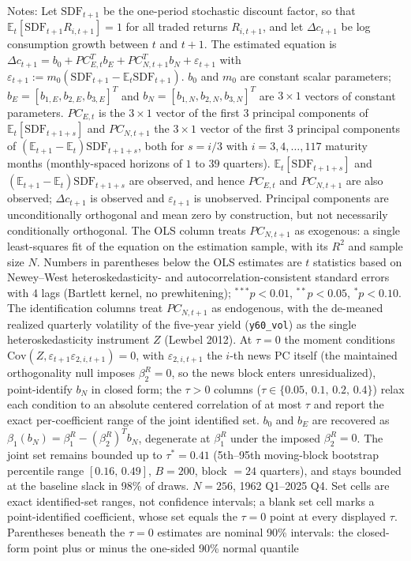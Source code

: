 \documentclass[11pt]{article}
\begin{document}
\begin{table}[!htbp]
\begin{threeparttable}
\begin{tablenotes}[flushleft]
\item Notes: Let $\mathrm{SDF}_{t+1}$ be the one-period stochastic discount factor, so that $\mathbb{E}_{t}[\mathrm{SDF}_{t+1}R_{i,t+1}]=1$ for all traded returns $R_{i,t+1}$, and let $\Delta c_{t+1}$ be log consumption growth between $t$ and $t+1$. The estimated equation is $\Delta c_{t+1}=b_{0}+PC_{E,t}^{T}b_{E}+PC_{N,t+1}^{T}b_{N}+\varepsilon_{t+1}$ with $\varepsilon_{t+1}:=m_{0}(\mathrm{SDF}_{t+1}-\mathbb{E}_{t}\mathrm{SDF}_{t+1})$. $b_{0}$ and $m_{0}$ are constant scalar parameters; $b_{E}=[b_{1,E},b_{2,E},b_{3,E}]^{T}$ and $b_{N}=[b_{1,N},b_{2,N},b_{3,N}]^{T}$ are $3\times1$ vectors of constant parameters. $PC_{E,t}$ is the $3\times1$ vector of the first 3 principal components of $\mathbb{E}_{t}[\mathrm{SDF}_{t+1+s}]$ and $PC_{N,t+1}$ the $3\times1$ vector of the first 3 principal components of $(\mathbb{E}_{t+1}-\mathbb{E}_{t})\mathrm{SDF}_{t+1+s}$, both for $s=i/3$ with $i=3,4,\ldots,117$ maturity months (monthly-spaced horizons of $1$ to $39$ quarters). $\mathbb{E}_{t}[\mathrm{SDF}_{t+1+s}]$ and $(\mathbb{E}_{t+1}-\mathbb{E}_{t})\mathrm{SDF}_{t+1+s}$ are observed, and hence $PC_{E,t}$ and $PC_{N,t+1}$ are also observed; $\Delta c_{t+1}$ is observed and $\varepsilon_{t+1}$ is unobserved. Principal components are unconditionally orthogonal and mean zero by construction, but not necessarily conditionally orthogonal. The OLS column treats $PC_{N,t+1}$ as exogenous: a single least-squares fit of the equation on the estimation sample, with its $R^2$ and sample size $N$. Numbers in parentheses below the OLS estimates are $t$ statistics based on Newey--West heteroskedasticity- and autocorrelation-consistent standard errors with 4 lags (Bartlett kernel, no prewhitening); $^{***}p<0.01$, $^{**}p<0.05$, $^{*}p<0.10$. The identification columns treat $PC_{N,t+1}$ as endogenous, with the de-meaned realized quarterly volatility of the five-year yield (\texttt{y60\_vol}) as the single heteroskedasticity instrument $Z$ (Lewbel 2012). At $\tau{=}0$ the moment conditions $\mathrm{Cov}(Z,\varepsilon_{t+1}\varepsilon_{2,i,t+1})=0$, with $\varepsilon_{2,i,t+1}$ the $i$-th news PC itself (the maintained orthogonality null imposes $\beta_{2}^{R}=0$, so the news block enters unresidualized), point-identify $b_{N}$ in closed form; the $\tau{>}0$ columns ($\tau\in\{0.05,\,0.1,\,0.2,\,0.4\}$) relax each condition to an absolute centered correlation of at most $\tau$ and report the exact per-coefficient range of the joint identified set. $b_{0}$ and $b_{E}$ are recovered as $\beta_{1}(b_{N})=\beta_{1}^{R}-(\beta_{2}^{R})^{T}b_{N}$, degenerate at $\beta_{1}^{R}$ under the imposed $\beta_{2}^{R}=0$. The joint set remains bounded up to $\tau^{*}=0.41$ (5th--95th moving-block bootstrap percentile range $[0.16,\,0.49]$, $B=200$, block $=24$ quarters), and stays bounded at the baseline slack in 98\% of draws. $N=256$, 1962 Q1--2025 Q4. Set cells are exact identified-set ranges, not confidence intervals; a blank set cell marks a point-identified coefficient, whose set equals the $\tau{=}0$ point at every displayed $\tau$. Parentheses beneath the $\tau{=}0$ estimates are nominal 90\% intervals: the closed-form point plus or minus the one-sided 90\% normal quantile 
\end{tablenotes}
\end{threeparttable}
\end{table}
\end{document}
